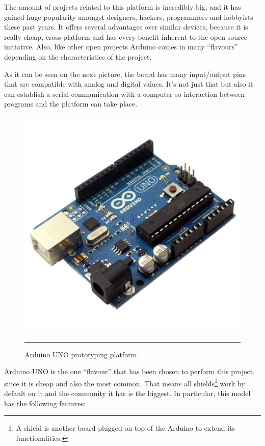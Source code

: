 The amount of projects related to this platform is incredibly big, and it has gained huge popularity amongst designers, hackers, programmers and hobbyists these past years. It offers several advantages over similar devices, because it is really cheap, cross-platform and has every benefit inherent to the open source initiative. Also, like other open projects Arduino comes in many ``flavours'' depending on the characteristics of the project.

As it can be seen on the next picture, the board has many input/output pins that are compatible with analog and digital values. It's not just that but also it can establish a serial communication with a computer so interaction between programs and the platform can take place.


\begin{figure}[htbp]
    \centering
    \includegraphics[scale=0.2]{./Figures/auno.jpg}
        \rule{35em}{0.5pt}
        \caption[Arduino UNO]{Arduino UNO prototyping platform.}
    \label{fig:ArduinoUNO}
\end{figure}

Arduino UNO is the one ``flavour'' that has been chosen to perform this project, since it is cheap and also the most common. That means all shields\footnote{A shield is another board plugged on top of the Arduino to extend its functionalities.}  work by default on it and the community it has is the biggest. In particular, this model has the following features\citep{arduinounor3}:
\\

